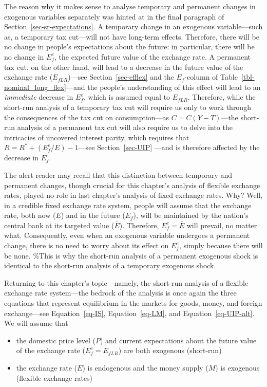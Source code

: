 \documentclass[
  letterpaper,
]{book}
\providecommand{\tightlist}{%
  \setlength{\itemsep}{0pt}\setlength{\parskip}{0pt}}\usepackage{longtable,booktabs,array}
\theoremstyle{plain}
\theoremstyle{remark}
\begin{document}
The reason why it makes sense to analyse temporary and permanent changes
in exogenous variables separately was hinted at in the final paragraph
of Section~\ref{sec-sr-expectations}. A temporary change in an exogenous
variable---such as, a temporary tax cut---will not have long-term
effects. Therefore, there will be no change in people's expectations
about the future: in particular, there will be no change in \(E_f^e\),
the expected future value of the exchange rate. A permanent tax cut, on
the other hand, will lead to a decrease in the future value of the
exchange rate (\(E_{fLR}\))---see Section~\ref{sec-efflex} and the
\(E_f\)-column of Table~\ref{tbl-nominal_long_flex}---and the people's
understanding of this effect will lead to an \emph{immediate} decrease
in \(E_f^e\), which is assumed equal to \(E_{fLR}\). Therefore, while
the short-run analysis of a temporary tax cut will require us only to
work through the consequences of the tax cut on consumption---as
\(C=C(Y-T)\)---the short-run analysis of a permanent tax cut will also
require us to delve into the intricacies of uncovered interest parity,
which requires that \(R=R^*+(E_f^e/E)-1\)---see Section~\ref{sec-UIP}
---and is therefore affected by the decrease in \(E_f^e\).

The alert reader may recall that this distinction between temporary and
permanent changes, though crucial for this chapter's analysis of
flexible exchange rates, played no role in last chapter's analysis of
fixed exchange rates. Why? Well, in a credible fixed exchange rate
system, people will assume that the exchange rate, both now (\(E\)) and
in the future (\(E_f\)), will be maintained by the nation's central bank
at its targeted value (\(\bar{E}\)). Therefore, \(E_f^e=\bar{E}\) will
prevail, no matter what. Consequently, even when an exogenous variable
undergoes a permanent change, there is no need to worry about its effect
on \(E_f^e\), simply because there will be none. \%This is why the
short-run analysis of a permanent exogenous shock is identical to the
short-run analysis of a temporary exogenous shock.

Returning to this chapter's topic---namely, the short-run analysis of a
flexible exchange rate system---the bedrock of the analysis is once
again the three equations that represent equilibrium in the markets for
goods, money, and foreign exchange---see Equation~\ref{eq-IS},
Equation~\ref{eq-LM}, and Equation~\ref{eq-UIP-alt}. We will assume that

\begin{itemize}
\tightlist
\item
  the domestic price level (\(P\)) and current expectations about the
  future value of the exchange rate (\(E_f^e=E_{fLR}\)) are both
  exogenous (short-run)
\item
  the exchange rate (\(E\)) is endogenous and the money supply (\(M\))
  is exogenous (flexible exchange rates)
\end{itemize}
\end{document}
